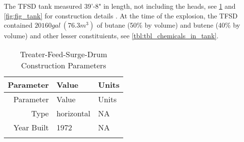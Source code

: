 \documentclass[10pt,parskip=half,
toc=sectionentrywithdots,
bibliography=totocnumbered,
captions=tableheading,numbers=noendperiod]{scrartcl}
\begin{document}
The TFSD tank measured 39'-8" in length, not including the heads, see
\cref{tbl:tbl_tank} and \cref{fig:fig_tank} for construction details
\cite{PES2019}. At the time of the explosion, the TFSD contained
\(20160gal\:(76.3m^3)\) of butane (50\% by volume) and butene (40\% by
volume) and other lesser constituients, see
\cref{tbl:tbl_chemicals_in_tank}.

\begin{longtable}[]{@{}rll@{}}
\caption{Treater-Feed-Surge-Drum Construction Parameters \cite{PES2019}
\label{tbl:tbl_tank}}\tabularnewline
\toprule
\begin{minipage}[b]{0.23\columnwidth}\raggedleft
Parameter\strut
\end{minipage} & \begin{minipage}[b]{0.23\columnwidth}\raggedright
Value\strut
\end{minipage} & \begin{minipage}[b]{0.23\columnwidth}\raggedright
Units\strut
\end{minipage}\tabularnewline
\midrule
\endfirsthead
\toprule
\begin{minipage}[b]{0.23\columnwidth}\raggedleft
Parameter\strut
\end{minipage} & \begin{minipage}[b]{0.23\columnwidth}\raggedright
Value\strut
\end{minipage} & \begin{minipage}[b]{0.23\columnwidth}\raggedright
Units\strut
\end{minipage}\tabularnewline
\midrule
\endhead
\begin{minipage}[t]{0.23\columnwidth}\raggedleft
Type\strut
\end{minipage} & \begin{minipage}[t]{0.23\columnwidth}\raggedright
horizontal\strut
\end{minipage} & \begin{minipage}[t]{0.23\columnwidth}\raggedright
NA\strut
\end{minipage}\tabularnewline
\begin{minipage}[t]{0.23\columnwidth}\raggedleft
Year Built\strut
\end{minipage} & \begin{minipage}[t]{0.23\columnwidth}\raggedright
1972\strut
\end{minipage} & \begin{minipage}[t]{0.23\columnwidth}\raggedright
NA\strut
\end{minipage}\tabularnewline
\begin{minipage}[t]{0.23\columnwidth}\raggedleft

\end{minipage}
\end{longtable}
\end{document}
